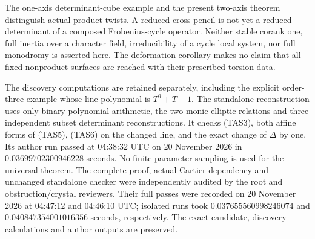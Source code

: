 \begin{remark}
\label{rem:ss-product-two-axis-squarefree-scope}
The one-axis determinant-cube example and the present two-axis
theorem distinguish actual product twists. A reduced cross pencil
is not yet a reduced determinant of a composed Frobenius-cycle
operator. Neither stable corank one, full inertia over a character
field, irreducibility of a cycle local system, nor full monodromy
is asserted here. The deformation corollary makes no claim that
all fixed nonproduct surfaces are reached with their prescribed
torsion data.

The discovery computations are retained separately, including the
explicit order-three example whose line polynomial is \(T^9+T+1\).
The standalone reconstruction
uses only binary polynomial arithmetic, the two monic elliptic
relations and three independent subset determinant reconstructions.
It checks (TAS3), both affine forms of (TAS5), (TAS6) on the
changed line, and the exact change of \(\Delta\) by one.
Its author run passed at 04:38:32 UTC on 20 November 2026 in
\(0.03699702300946228\) seconds. No finite-parameter sampling
is used for the universal theorem.
The complete proof, actual Cartier dependency and unchanged standalone
checker were independently audited by the root and obstruction/crystal
reviewers. Their full passes were recorded on 20 November 2026 at
04:47:12 and 04:46:10 UTC; isolated runs took
\(0.037655560998246074\) and \(0.040847354001016356\) seconds,
respectively. The exact candidate, discovery calculations and author
outputs are preserved.
\end{remark}
